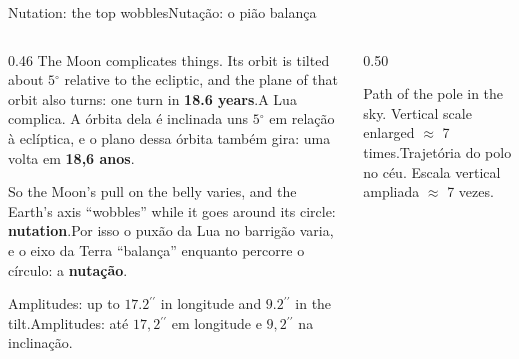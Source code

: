 \documentclass[aspectratio=169,11pt]{beamer}
\newcommand{\tr}[2]{\ifEN#2\else#1\fi}
\newcommand{\bnum}[1]{\textbf{\textcolor{mTeal}{#1}}}
\newcommand{\asec}{\ensuremath{{}^{\prime\prime}}}
\newcommand{\gr}{\ensuremath{{}^{\circ}}}
\begin{document}
\begin{frame}{\tr{Nutação: o pião balança}{Nutation: the top wobbles}}
  \begin{columns}[T]
    \begin{column}{0.46\textwidth}
      \tr{A Lua complica. A órbita dela é inclinada uns $5\gr$ em relação à eclíptica, e o plano
      dessa órbita também gira: uma volta em \bnum{18,6 anos}.}{The Moon complicates things.
      Its orbit is tilted about $5\gr$ relative to the ecliptic, and the plane of that orbit
      also turns: one turn in \bnum{18.6 years}.}
      \medskip

      \tr{Por isso o puxão da Lua no barrigão varia, e o eixo da Terra ``balança'' enquanto
      percorre o círculo: a \bnum{nutação}.}{So the Moon's pull on the belly varies, and the
      Earth's axis ``wobbles'' while it goes around its circle: \bnum{nutation}.}
      \medskip

      \tr{Amplitudes: até $17{,}2\asec$ em longitude e $9{,}2\asec$ na inclinação.}{Amplitudes:
      up to $17.2\asec$ in longitude and $9.2\asec$ in the tilt.}
    \end{column}
    \begin{column}{0.50\textwidth}
      \centering
      \par
      {\scriptsize\textcolor{mStoneMid}{\tr{Trajetória do polo no céu. Escala vertical ampliada
      $\approx$ 7 vezes.}{Path of the pole in the sky. Vertical scale enlarged $\approx$ 7
      times.}}}
    \end{column}
  \end{columns}
\end{frame}
\end{document}
